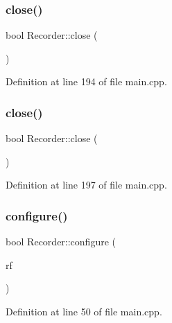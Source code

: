 \subsubsection{\texorpdfstring{close()}{close()}\hspace{0.1cm}{\footnotesize\ttfamily [1/2]}}
{\footnotesize\ttfamily bool Recorder\+::close (\begin{DoxyParamCaption}{ }\end{DoxyParamCaption})\hspace{0.3cm}{\ttfamily [inline]}}



Definition at line 194 of file main.\+cpp.

\mbox{\label{classRecorder_a25b5d0cb6f7e7c591cabb0b34ebc81e2}} 
\subsubsection{\texorpdfstring{close()}{close()}\hspace{0.1cm}{\footnotesize\ttfamily [2/2]}}
{\footnotesize\ttfamily bool Recorder\+::close (\begin{DoxyParamCaption}{ }\end{DoxyParamCaption})\hspace{0.3cm}{\ttfamily [inline]}}



Definition at line 197 of file main.\+cpp.

\mbox{\label{classRecorder_a4d808e388c2c8369c253cfbb7bd574cf}} 
\subsubsection{\texorpdfstring{configure()}{configure()}\hspace{0.1cm}{\footnotesize\ttfamily [1/2]}}
{\footnotesize\ttfamily bool Recorder\+::configure (\begin{DoxyParamCaption}\item[{Resource\+Finder \&}]{rf }\end{DoxyParamCaption})\hspace{0.3cm}{\ttfamily [inline]}}



Definition at line 50 of file main.\+cpp.

